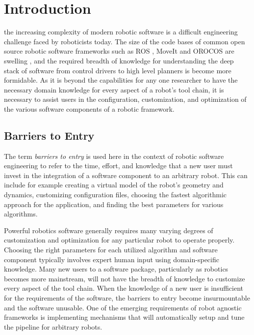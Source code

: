 \documentclass[10pt,journal,compsoc]{joser1}
\begin{document}
\section{Introduction}
 {the increasing complexity of modern robotic software is a difficult engineering challenge faced by roboticists today. The size of the code bases of common open source robotic software frameworks such as ROS \cite{quigley2009ros}, MoveIt \cite{MoveIt} and OROCOS \cite{bruyninckx2001open} are swelling \cite{makarenko2007benefits}, and the required breadth of knowledge for understanding the deep stack of software from control drivers to high level planners is become more formidable. As it is beyond the capabilities for any one researcher to have the necessary domain knowledge for every aspect of a robot's tool chain, it is necessary to assist users in the configuration, customization, and optimization of the various software components of a robotic framework. 

\subsection{Barriers to Entry}

The term \textit{barriers to entry} is used here in the context of robotic software engineering to refer to the time, effort, and knowledge that a new user must invest in the integration of a software component to an arbitrary robot. This can include for example creating a virtual model of the robot's geometry and dynamics, customizing configuration files, choosing the fastest algorithmic approach for the application, and finding the best parameters for various algorithms. 

Powerful robotics software generally requires many varying degrees of customization and optimization for any particular robot to operate properly. Choosing the right parameters for each utilized algorithm and software component typically involves expert human input using domain-specific knowledge. Many new users to a software package, particularly as robotics becomes more mainstream, will not have the breadth of knowledge to customize every aspect of the tool chain. When the knowledge of a new user is insufficient for the requirements of the software, the barriers to entry become insurmountable and the software unusable. One of the emerging requirements of robot agnostic frameworks is implementing mechanisms that will automatically setup and tune the pipeline for arbitrary robots.

}
\end{document}
